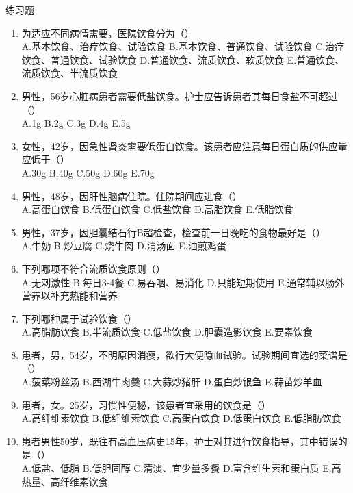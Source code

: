 \documentclass[11pt, a4paper]{ctexart}
\begin{document}
\begin{examplebox}{练习题}
	\begin{enumerate}
		\item 为适应不同病情需要，医院饮食分为（\qquad）\\
		      A.基本饮食、治疗饮食、试验饮食 \quad B.基本饮食、普通饮食、试验饮食 \quad C.治疗饮食、普通饮食、试验饮食 \quad D.普通饮食、流质饮食、软质饮食 \quad E.普通饮食、流质饮食、半流质饮食
		\item 男性，56岁心脏病患者需要低盐饮食。护士应告诉患者其每日食盐不可超过（\qquad）\\
		      A.1g \quad B.2g \quad C.3g \quad D.4g \quad E.5g
		\item 女性，42岁，因急性肾炎需要低蛋白饮食。该患者应注意每日蛋白质的供应量应低于（\qquad）\\
		      A.30g \quad B.40g \quad C.50g \quad D.60g \quad E.70g
		\item 男性，48岁，因肝性脑病住院。住院期间应进食（\qquad）\\
		      A.高蛋白饮食 \quad B.低蛋白饮食 \quad C.低盐饮食 \quad D.高脂饮食 \quad E.低脂饮食
		\item 男性，37岁，因胆囊结石行B超检查，检查前一日晚吃的食物最好是（\qquad）\\
		      A.牛奶 \quad B.炒豆腐 \quad C.烧牛肉 \quad D.清汤面 \quad E.油煎鸡蛋
		\item 下列哪项不符合流质饮食原则（\qquad）\\
		      A.无刺激性 \quad B.每日3-4餐 \quad C.易吞咽、易消化 \quad D.只能短期使用 \quad E.通常辅以肠外营养以补充热能和营养
		\item 下列哪种属于试验饮食（\qquad）\\
		      A.高脂肪饮食 \quad B.半流质饮食 \quad C.低盐饮食 \quad D.胆囊造影饮食 \quad E.要素饮食
		\item 患者，男，54岁，不明原因消瘦，欲行大便隐血试验。试验期间宜选的菜谱是（\qquad）\\
		      A.菠菜粉丝汤 \quad B.西湖牛肉羹 \quad C.大蒜炒猪肝 \quad D.蛋白炒银鱼 \quad E.蒜苗炒羊血
		\item 患者，女。25岁，习惯性便秘，该患者宜采用的饮食是（\qquad）\\
		      A.高纤维素饮食 \quad B.低纤维素饮食 \quad C.高蛋白饮食 \quad D.低蛋白饮食 \quad E.低脂肪饮食
		\item 患者男性50岁，既往有高血压病史15年，护士对其进行饮食指导，其中错误的是（\qquad）\\
		      A.低盐、低脂 \quad B.低胆固醇 \quad C.清淡、宜少量多餐 \quad D.富含维生素和蛋白质 \quad E.高热量、高纤维素饮食
	\end{enumerate}
\end{examplebox}
\end{document}
